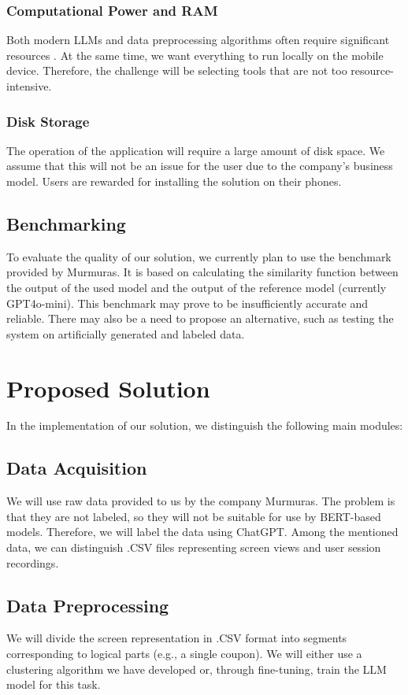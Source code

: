 \documentclass[12pt]{article}
\begin{document}
\subsubsection*{Computational Power and RAM}
Both modern LLMs and data preprocessing algorithms often require significant resources \cite{LLMmobile2024}. At the same time, we want everything to run locally on the mobile device. Therefore, the challenge will be selecting tools that are not too resource-intensive.

\subsubsection*{Disk Storage}
The operation of the application will require a large amount of disk space. We assume that this will not be an issue for the user due to the company's business model. Users are rewarded for installing the solution on their phones.

\subsection*{Benchmarking}
To evaluate the quality of our solution, we currently plan to use the benchmark provided by Murmuras. It is based on calculating the similarity function between the output of the used model and the output of the reference model (currently GPT4o-mini). This benchmark may prove to be insufficiently accurate and reliable. There may also be a need to propose an alternative, such as testing the system on artificially generated and labeled data.

\section*{Proposed Solution}
In the implementation of our solution, we distinguish the following main modules:

\subsection*{Data Acquisition}
We will use raw data provided to us by the company Murmuras. The problem is that they are not labeled, so they will not be suitable for use by BERT-based models. Therefore, we will label the data using ChatGPT. Among the mentioned data, we can distinguish .CSV files representing screen views and user session recordings.

\subsection*{Data Preprocessing}
We will divide the screen representation in .CSV format into segments corresponding to logical parts (e.g., a single coupon). We will either use a clustering algorithm we have developed or, through fine-tuning, train the LLM model for this task.
\end{document}
